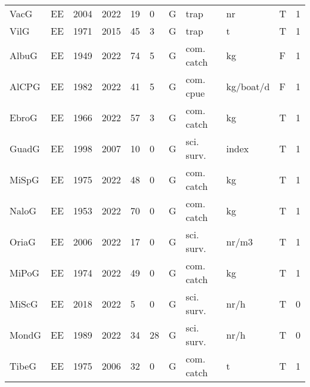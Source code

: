 \begin{table}[ht]
\begin{tabular}{p{1cm}p{1cm}p{1cm}p{1cm}p{0.8cm}p{0.8cm}p{1cm}p{2cm}p{2cm}p{1cm}p{1cm}}
  VacG & EE & 2004 & 2022 & 19 & 0 & G & trap & nr & T & 1 \\ 
  VilG & EE & 1971 & 2015 & 45 & 3 & G & trap & t & T & 1 \\ 
  AlbuG & EE & 1949 & 2022 & 74 & 5 & G & com. catch & kg & F & 1 \\ 
  AlCPG & EE & 1982 & 2022 & 41 & 5 & G & com. cpue & kg/boat/d & F & 1 \\ 
  EbroG & EE & 1966 & 2022 & 57 & 3 & G & com. catch & kg & T & 1 \\ 
  GuadG & EE & 1998 & 2007 & 10 & 0 & G & sci. surv. & index & T & 1 \\ 
  MiSpG & EE & 1975 & 2022 & 48 & 0 & G & com. catch & kg & T & 1 \\ 
  NaloG & EE & 1953 & 2022 & 70 & 0 & G & com. catch & kg & T & 1 \\ 
  OriaG & EE & 2006 & 2022 & 17 & 0 & G & sci. surv. & nr/m3 & T & 1 \\ 
  MiPoG & EE & 1974 & 2022 & 49 & 0 & G & com. catch & kg & T & 1 \\ 
  MiScG & EE & 2018 & 2022 & 5 & 0 & G & sci. surv. & nr/h & T & 0 \\ 
  MondG & EE & 1989 & 2022 & 34 & 28 & G & sci. surv. & nr/h & T & 0 \\ 
  TibeG & EE & 1975 & 2006 & 32 & 0 & G & com. catch & t & T & 1 \\ 
   \hline
\end{tabular}
\end{table}
